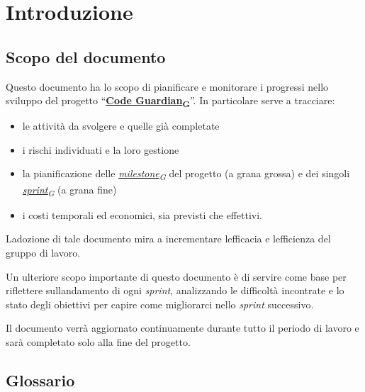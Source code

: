 \documentclass[12pt, a4paper]{article}
\newcommand{\urlglossario}{https://skynetunigroup.github.io/Code_Guardian/Documentazione/RTB/glossario_v1.0.0.pdf} %
\newcommand{\glo}[2]{\href{\urlglossario\#nameddest=#2}{#1\textsubscript{G}}}
\begin{document}
\tableofcontents
\iftotaltables  %
    \vspace{1cm}
    \listoftables
\fi

\iftotalfigures
    \vspace{1cm}
    \listoffigures
\fi
\newpage


\section{Introduzione}

\subsection{Scopo del documento}

Questo documento ha lo scopo di pianificare e monitorare i progressi nello sviluppo del progetto ``\textbf{\glo{Code Guardian}{code-guardian}}''.
In particolare serve a tracciare:

\begin{itemize}
\item
  le attività da svolgere e quelle già completate
\item
  i rischi individuati e la loro gestione
\item
  la pianificazione delle \textit{\glo{milestone}{milestone}} del progetto (a grana grossa) e dei
  singoli \textit{\glo{sprint}{sprint}} (a grana fine)
\item
  i costi temporali ed economici, sia previsti che effettivi.
\end{itemize}

L\textquotesingle adozione di tale documento mira a incrementare
l\textquotesingle efficacia e l\textquotesingle efficienza del gruppo di
lavoro.

Un ulteriore scopo importante di questo documento è di servire come base
per riflettere sull\textquotesingle andamento di ogni \textit{sprint},
analizzando le difficoltà incontrate e lo stato degli obiettivi per
capire come migliorarci nello \textit{sprint} successivo.

Il documento verrà aggiornato continuamente durante tutto il periodo di
lavoro e sarà completato solo alla fine del progetto.

\subsection{\textbf{Glossario}}
\end{document}
